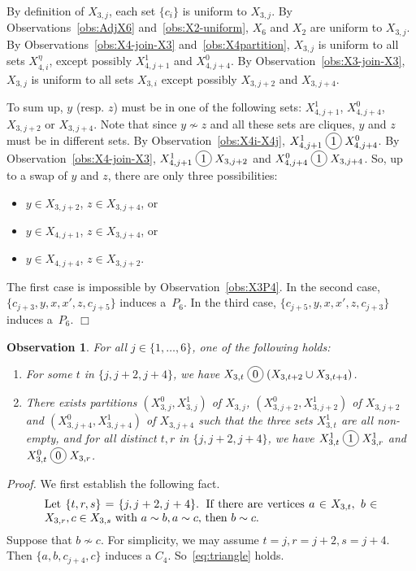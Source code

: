 \documentclass[12pt]{article}
\newcommand*\circled[1]{\tikz[baseline=(char.base)]{
		\node[shape=circle,draw,inner sep=2pt] (char) {#1};}}
\newtheorem{Observation}[Theorem]{Observation}
\newcommand{\join}{\; \circled{1} \;}
\newcommand{\cojoin}{\; \circled{0} \;}
\newcommand{\qed}{\hfill $\Box$}
\begin{document}
By definition of $X_{3, j}$, each set $\{c_i\}$ is uniform to $X_{3, j}$.  By Observations~\ref{obs:AdjX6} and~\ref{obs:X2-uniform}, $X_6$ and $X_2$ are uniform to  $X_{3, j}$. 
% 
By Observations~\ref{obs:X4-join-X3} and~\ref{obs:X4partition},  $X_{3, j}$ is uniform to all sets $X_{4, i}^\eta$, except possibly $X_{4, j+1}^1$ and $X_{4, j+4}^0$.  By Observation~\ref{obs:X3-join-X3}, $X_{3, j}$ is uniform to all sets $X_{3, i}$ except possibly $X_{3, j+2}$ and $X_{3, j+4}$. 

To sum up, $y$ (resp. $z$) must be in one of the following sets: $X_{4, j+1}^1$, $X_{4, j+4}^0$,  $X_{3, j+2}$ or $X_{3, j+4}$. Note that since $y\not\sim z$ and all these sets are cliques, $y$ and $z$ must be in different sets.  By Observation~\ref{obs:X4i-X4j}, $X_{4, j+1}^1 \join X_{4, j+4}^0$. By Observation~\ref{obs:X4-join-X3}, $X_{4, j+1}^1 \join X_{3, j+2}$ and $X_{4, j+4}^0 \join X_{3, j+4}$.  So, up to a swap of $y$ and $z$, there are only three possibilities: 
\begin{itemize}
	\item $y \in X_{3,j+2}$, $z \in X_{3,j+4}$,  or  
	\item $y \in X_{4,j+1}$, $z \in X_{3,j+4}$, or
	\item $y \in X_{4,j+4}$, $z \in X_{3,j+2}$.    
\end{itemize}

The first case is impossible by Observation~\ref{obs:X3P4}. In the second case, $\{c_{j+3}, y, x, x', z, c_{j+5}\}$ induces a~$P_6$.  In the third case, $\{c_{j+5}, y, x, x', z, c_{j+3}\}$ induces a~$P_6$.  
\qed



\begin{Observation}\label{obs:triangular}
	For all $j\in \{1, \dots, 6\}$,  one of the following holds: 
	\begin{enumerate}
		\item For some $t$ in $\{j, j+2, j+4\}$, we have $X_{3, t} \cojoin (X_{3, t+2} \cup X_{3, t+4})$.
		\item There exists partitions	$(X_{3,j}^0, X_{3,j}^1)$ of $X_{3,j}$, $(X_{3,j+2}^0, X_{3,j+2}^1)$ of $X_{3,j+2}$ and $(X_{3,j+4}^0, X_{3,j+4}^1)$ of $X_{3,j+4}$ such that the three sets $X^1_{3,t}$ are all non-empty, and  for all distinct $t,r$ in $\{j, j+2, j+4\}$, we have  $X_{3,t}^1 \join X_{3,r}^1$  and $X_{3,t}^0 \cojoin X_{3,r}$.	    
	\end{enumerate}
\end{Observation}

\noindent
{\it Proof.} We  first establish the following fact. 
\begin{equation}\label{eq:triangle}
	\text{\parbox{.85\textwidth}{Let $\{ t,r,s\} = \{j,j+2, j+4\}$. If there are vertices $a \in X_{3,t} , \; b \in X_{3,r}, c \in X_{3,s}$ with $a \sim b, a \sim c$, then $b \sim c$.}}
\end{equation}
Suppose that $b \not\sim c$. For simplicity, we may assume $t=j, r=j+2, s = j+4$. Then $\{a,b,c_{j+4},c\}$ induces a $C_4$. So~\eqref{eq:triangle} holds. 
\end{document}
